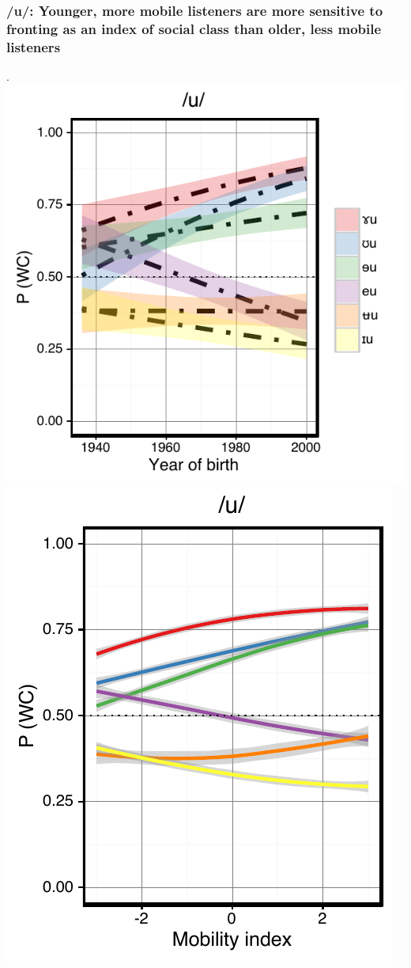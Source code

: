 \documentclass[a0,final]{a0poster}
\begin{document}
\begin{multicols}{4}
\subsubsection*{/u/: Younger, more mobile listeners are more sensitive to fronting as an index of social class than older, less mobile listeners}.
\includegraphics[scale=1.25]{u_perception_age_sd.pdf}
\includegraphics[scale=1.25]{u_perception_mobility.pdf}
\vspace*{-1.5cm}

\end{multicols}
\end{document}
